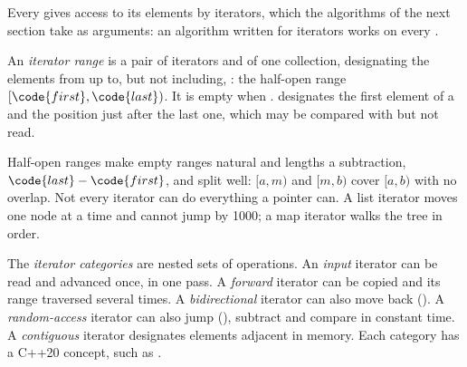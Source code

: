 Every  gives access to its elements by iterators, which the algorithms of the next section take as
arguments: an algorithm written for iterators works on every .

\begin{definition}\label{def:b2:cpp-standard-library:iterator}
An \emph{iterator range} is a pair of iterators  and  of one
collection, designating the elements from  up to, but not including, : the half-open range
$[\code{first}, \code{last})$. It is empty when .  designates the first element
of a   and  the position just after the last one, which may be compared with but not
read.
\end{definition}

Half-open ranges make empty ranges natural and lengths a subtraction, $\code{last} - \code{first}$, and split well:
$[a, m)$ and $[m, b)$ cover $[a, b)$ with no overlap. Not every iterator can do everything a pointer can. A list
iterator moves one node at a time and cannot jump by 1000; a map iterator walks the tree in order.

\begin{definition}\label{def:b2:cpp-standard-library:category}
The \emph{iterator categories} are nested sets of operations. An \emph{input} iterator
can be read and advanced once, in one pass. A \emph{forward} iterator can be copied and its range traversed several
times. A \emph{bidirectional} iterator can also move back (). A \emph{random-access} iterator can also
jump (), subtract and compare in constant time. A \emph{contiguous} iterator designates elements
adjacent in memory. Each category has a C++20 concept, such as .
\end{definition}

